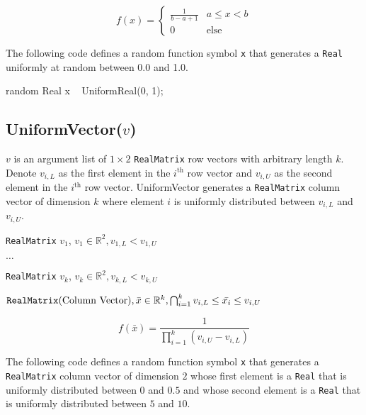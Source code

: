 \[
	f(x) = \left\{
		  \begin{array}{lr}
		    \frac{1}{b - a + 1} & a \leq x < b \\
		    0 					& \text{else}
		  \end{array}
		\right.
\]

The following code defines a random function symbol \verb|x| that generates a \verb|Real| uniformly at random between 0.0 and 1.0.

\begin{blogcode}
random Real x ~ UniformReal(0, 1);
\end{blogcode}

\subsection{UniformVector($v$)}

$v$ is an argument list of $1 \times 2$ \verb|RealMatrix| row vectors with arbitrary length $k$. Denote $v_{i,L}$ as the first element in the $i^{\text{th}}$ row vector and $v_{i, U}$ as the second element in the $i^{\text{th}}$ row vector. UniformVector generates a \verb|RealMatrix| column vector of dimension $k$ where element $i$ is uniformly distributed between $v_{i,L}$ and $v_{i,U}$.

\begin{itemize*}
\item[] \verb|RealMatrix| $v_{1}$, $v_{1} \in \mathbb{R}^{2}, v_{1,L} < v_{1,U}$
\item[] $\ldots$
\item[] \verb|RealMatrix| $v_{k}$, $v_{k} \in \mathbb{R}^{2}, 
v_{k,L} < v_{k,U}$

\end{itemize*}

\begin{itemize*}
\item[] $\verb|RealMatrix| \text{(Column Vector)}, 
\bar{x} \in \mathbb{R}^{k}, \bigcap_{i=1}^{k} v_{i,L} \leq \bar{x_{i}} \leq v_{i,U}  $
\end{itemize*}

\[
	f(\bar{x}) = \frac{1}{\prod_{i=1}^{k} (v_{i,U} - v_{i,L})}
\]

The following code defines a random function symbol \verb|x| that generates a \verb|RealMatrix| column vector of dimension $2$ whose first element is a \verb|Real| that is uniformly distributed between $0$ and $0.5$ and whose second element is a \verb|Real| that is uniformly distributed between $5$ and $10$.

